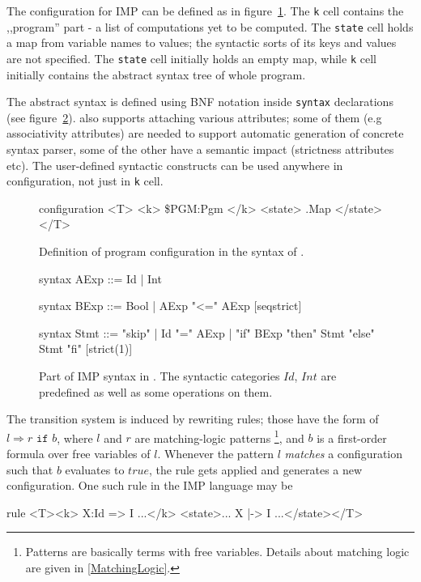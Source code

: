 \documentclass{fithesis3}
\newcommand{\var}[1]{\mathit{#1}}
\begin{document}
The configuration for IMP can be defined as in figure~\ref{ImpConfigurationInK}. The \texttt{k} cell contains the ,,program'' part - a list of computations yet to be computed. The \texttt{state} cell holds a map from variable names to values; the syntactic sorts of its keys and values are not specified. The \texttt{state} cell initially holds an empty map, while \texttt{k} cell initially contains the abstract syntax tree of whole program.

The abstract syntax is defined using BNF notation inside \texttt{syntax} declarations (see figure~\ref{ImpSyntaxInK}). \K also supports attaching various attributes; some of them (e.g associativity attributes) are needed to support automatic generation of concrete syntax parser, some of the other have a semantic impact (strictness attributes etc). The user-defined syntactic constructs can be used anywhere in configuration, not just in \texttt{k} cell.

\begin{figure}
\caption{Definition of program configuration in the syntax of \K. }
\label{ImpConfigurationInK}
\begin{asciik}
configuration <T> <k> \$PGM:Pgm </k> <state> .Map </state> </T>
\end{asciik}
\end{figure}

\begin{figure}
\caption{Part of IMP syntax in \K. The syntactic categories $\var{Id}$, $\var{Int}$ are predefined as well as some operations on them. }
\label{ImpSyntaxInK}
\begin{asciik}
syntax AExp ::= Id | Int

syntax BExp  ::= Bool
| AExp "<=" AExp [seqstrict]

syntax Stmt  ::= "skip"
| Id "=" AExp
| "if" BExp "then" Stmt "else" Stmt "fi" [strict(1)]
\end{asciik}
\end{figure}






The transition system is induced by rewriting rules; those have the form of $l \Rightarrow r \texttt{ if } b$, where $l$ and $r$ are matching-logic patterns \footnote{Patterns are basically terms with free variables. Details about matching logic are given in \ref{MatchingLogic}.},
and $b$ is a first-order formula over free variables of $l$. Whenever the pattern $l$ \textit{matches} a configuration such that $b$ evaluates to $\var{true}$, the rule gets applied and generates a new configuration. One such rule in the IMP language may be
\begin{asciik}[basicstyle=\small]
rule <T><k> X:Id => I ...</k>
     <state>... X |-> I ...</state></T>
\end{asciik}
\end{document}
